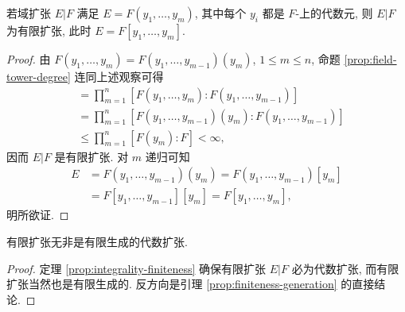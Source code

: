 \begin{lemma}\label{prop:finiteness-generation}
	若域扩张 $E|F$ 满足 $E=F(y_1, \ldots, y_m)$, 其中每个 $y_i$ 都是 $F$-上的代数元, 则 $E|F$ 为有限扩张, 此时 $E=F[y_1, \ldots, y_m]$.
\end{lemma}
\begin{proof}
	由 $F(y_1, \ldots, y_m) = F(y_1, \ldots, y_{m-1})(y_m)$, $1 \leq m \leq n$, 命题 \ref{prop:field-tower-degree} 连同上述观察可得
	\begin{align*}
		[F(y_1, \ldots, y_n):F] & = \prod_{m=1}^n \left[ F(y_1, \ldots, y_m): F(y_1, \ldots, y_{m-1}) \right] \\
		& = \prod_{m=1}^n \left[ F(y_1, \ldots, y_{m-1})(y_m): F(y_1, \ldots, y_{m-1}) \right] \\
		& \leq \prod_{m=1}^n [F(y_m):F] < \infty,
	\end{align*}
	因而 $E|F$ 是有限扩张. 对 $m$ 递归可知
	\begin{equation*}\begin{aligned}
		E & = F(y_1, \ldots, y_{m-1})(y_m) = F(y_1, \ldots, y_{m-1})[y_m] \\
		& = F[y_1, \ldots, y_{m-1}][y_m] = F[y_1, \ldots, y_m],
	\end{aligned}\end{equation*}
	明所欲证.
\end{proof}

\begin{lemma}\label{prop:finite-vs-algebraic}
	有限扩张无非是有限生成的代数扩张.
\end{lemma}
\begin{proof}
	定理 \ref{prop:integrality-finiteness} 确保有限扩张 $E|F$ 必为代数扩张, 而有限扩张当然也是有限生成的. 反方向是引理 \ref{prop:finiteness-generation} 的直接结论.
\end{proof}


